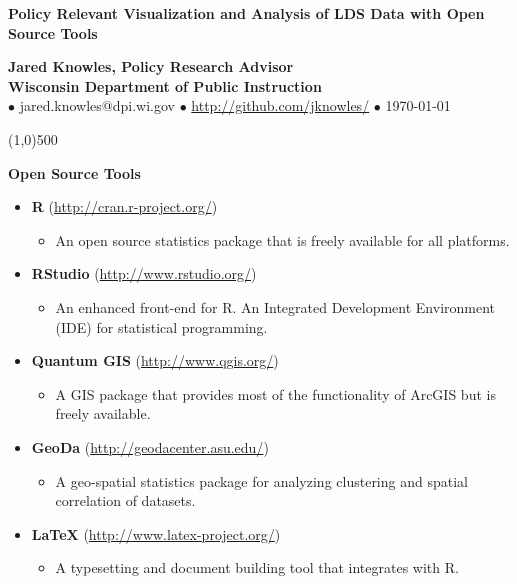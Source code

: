 \documentclass{article}
\begin{document}
\setcounter{page}{0}
\thispagestyle{empty}
\begin{center}

\Large \textbf{Policy Relevant Visualization and Analysis of LDS Data with Open Source Tools} \\
\vspace{.15in}

\normalsize \textbf{Jared Knowles, Policy Research Advisor} \\
\vspace{6pt}
\normalsize \textbf{Wisconsin Department of Public Instruction} \\
\vspace{6pt}
\scriptsize $\bullet$ jared.knowles@dpi.wi.gov $\bullet$ \href{http://github.com/jknowles/}{http://github.com/jknowles/} $\bullet$ \today \\
\end{center}

\line(1,0){500}

\vspace{.05in}

\textbf{Open Source Tools}

\begin{itemize}
  \item \textbf{R} (\href{http://cran.r-project.org/}{http://cran.r-project.org/})
    \begin{itemize}
    \item An open source statistics package that is freely available for all platforms.
    \end{itemize}
  \item \textbf{RStudio} (\href{http://www.rstudio.org/}{http://www.rstudio.org/})
    \begin{itemize}
    \item An enhanced front-end for R. An Integrated Development Environment (\textsc{IDE}) for statistical programming.
    \end{itemize}
  \item \textbf{Quantum GIS} (\href{http://www.qgis.org/}{http://www.qgis.org/})
    \begin{itemize}
    \item A GIS package that provides most of the functionality of ArcGIS but is freely available.
    \end{itemize}
  \item \textbf{GeoDa} (\href{http://geodacenter.asu.edu/}{http://geodacenter.asu.edu/})
    \begin{itemize}
    \item A geo-spatial statistics package for analyzing clustering and spatial correlation of datasets.
    \end{itemize}
  \item \textbf{\LaTeX{}} (\href{http://www.latex-project.org/}{http://www.latex-project.org/})
    \begin{itemize}
    \item A typesetting and document building tool that integrates with R.
    \end{itemize}

\end{itemize}
\end{document}

